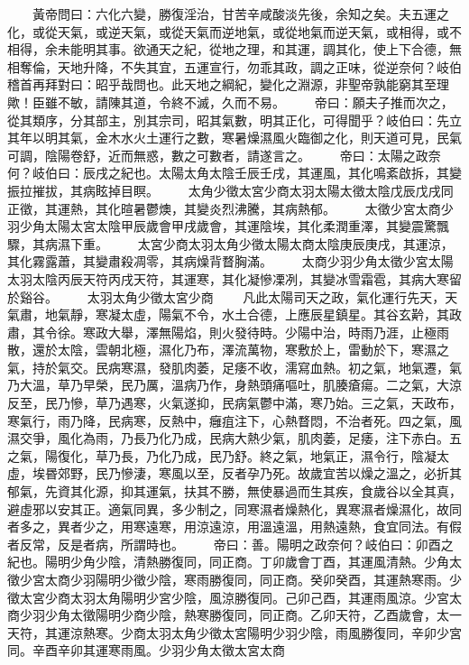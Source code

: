 　　黃帝問曰：六化六變，勝復淫治，甘苦辛咸酸淡先後，余知之矣。夫五運之化，或從天氣，或逆天氣，或從天氣而逆地氣，或從地氣而逆天氣，或相得，或不相得，余未能明其事。欲通天之紀，從地之理，和其運，調其化，使上下合德，無相奪倫，天地升降，不失其宜，五運宣行，勿乖其政，調之正味，從逆奈何？岐伯稽首再拜對曰：昭乎哉問也。此天地之綱紀，變化之淵源，非聖帝孰能窮其至理歟！臣雖不敏，請陳其道，令終不滅，久而不易。
　　帝曰：願夫子推而次之，從其類序，分其部主，別其宗司，昭其氣數，明其正化，可得聞乎？岐伯曰：先立其年以明其氣，金木水火土運行之數，寒暑燥濕風火臨御之化，則天道可見，民氣可調，陰陽卷舒，近而無惑，數之可數者，請遂言之。
　　帝曰：太陽之政奈何？岐伯曰：辰戌之紀也。太陽太角太陰壬辰壬戌，其運風，其化鳴紊啟拆，其變振拉摧拔，其病眩掉目瞑。
　　太角少徵太宮少商太羽太陽太徵太陰戊辰戊戌同正徵，其運熱，其化暄暑鬱燠，其變炎烈沸騰，其病熱郁。
　　太徵少宮太商少羽少角太陽太宮太陰甲辰歲會甲戌歲會，其運陰埃，其化柔潤重澤，其變震驚飄驟，其病濕下重。
　　太宮少商太羽太角少徵太陽太商太陰庚辰庚戌，其運涼，其化霧露蕭，其變肅殺凋零，其病燥背瞀胸滿。
　　太商少羽少角太徵少宮太陽太羽太陰丙辰天符丙戌天符，其運寒，其化凝慘凓冽，其變冰雪霜雹，其病大寒留於谿谷。
　　太羽太角少徵太宮少商
　　凡此太陽司天之政，氣化運行先天，天氣肅，地氣靜，寒凝太虛，陽氣不令，水土合德，上應辰星鎮星。其谷玄黅，其政肅，其令徐。寒政大舉，澤無陽焰，則火發待時。少陽中治，時雨乃涯，止極雨散，還於太陰，雲朝北極，濕化乃布，澤流萬物，寒敷於上，雷動於下，寒濕之氣，持於氣交。民病寒濕，發肌肉萎，足痿不收，濡寫血熱。初之氣，地氣遷，氣乃大溫，草乃早榮，民乃厲，溫病乃作，身熱頭痛嘔吐，肌腠瘡瘍。二之氣，大涼反至，民乃慘，草乃遇寒，火氣遂抑，民病氣鬱中滿，寒乃始。三之氣，天政布，寒氣行，雨乃降，民病寒，反熱中，癰疽注下，心熱瞀悶，不治者死。四之氣，風濕交爭，風化為雨，乃長乃化乃成，民病大熱少氣，肌肉萎，足痿，注下赤白。五之氣，陽復化，草乃長，乃化乃成，民乃舒。終之氣，地氣正，濕令行，陰凝太虛，埃昬郊野，民乃慘淒，寒風以至，反者孕乃死。故歲宜苦以燥之溫之，必折其郁氣，先資其化源，抑其運氣，扶其不勝，無使暴過而生其疾，食歲谷以全其真，避虛邪以安其正。適氣同異，多少制之，同寒濕者燥熱化，異寒濕者燥濕化，故同者多之，異者少之，用寒遠寒，用涼遠涼，用溫遠溫，用熱遠熱，食宜同法。有假者反常，反是者病，所謂時也。
　　帝曰：善。陽明之政奈何？岐伯曰：卯酉之紀也。陽明少角少陰，清熱勝復同，同正商。丁卯歲會丁酉，其運風清熱。少角太徵少宮太商少羽陽明少徵少陰，寒雨勝復同，同正商。癸卯癸酉，其運熱寒雨。少徵太宮少商太羽太角陽明少宮少陰，風涼勝復同。己卯己酉，其運雨風涼。少宮太商少羽少角太徵陽明少商少陰，熱寒勝復同，同正商。乙卯天符，乙酉歲會，太一天符，其運涼熱寒。少商太羽太角少徵太宮陽明少羽少陰，雨風勝復同，辛卯少宮同。辛酉辛卯其運寒雨風。少羽少角太徵太宮太商
